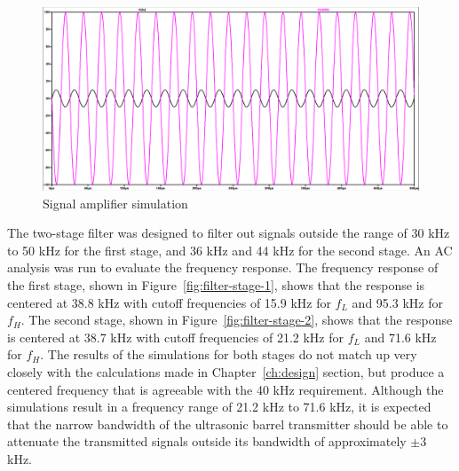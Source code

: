 \documentclass[class=report,11pt,crop=false]{standalone}
\begin{document}
\begin{figure}[htbp]
    \centering
    \includegraphics[width=0.8\columnwidth]{../Images/sim/amplifier_simulation.png}
    \caption{Signal amplifier simulation}
    \label{fig:signal-amplifier}
\end{figure}

The two-stage filter was designed to filter out signals outside the range of 30 kHz to 50 kHz for the first stage, and 36 kHz and 44 kHz for the second stage. An AC analysis was run to evaluate the frequency response. The frequency response of the first stage, shown in Figure~\ref{fig:filter-stage-1}, shows that the response is centered at 38.8 kHz with cutoff frequencies of 15.9 kHz for $f_L$ and 95.3 kHz for $f_H$. The second stage, shown in Figure~\ref{fig:filter-stage-2}, shows that the response is centered at 38.7 kHz with cutoff frequencies of 21.2 kHz for $f_L$ and 71.6 kHz for $f_H$. The results of the simulations for both stages do not match up very closely with the calculations made in Chapter~\ref{ch:design} section, but produce a centered frequency that is agreeable with the 40 kHz requirement. Although the simulations result in a frequency range of 21.2 kHz to 71.6 kHz, it is expected that the narrow bandwidth of the ultrasonic barrel transmitter should be able to attenuate the transmitted signals outside its bandwidth of approximately $\pm$3 kHz.
\end{document}
